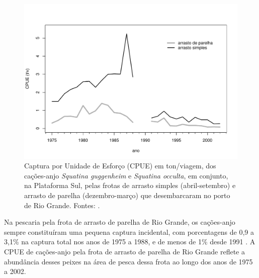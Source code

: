 \documentclass[a4paper,11pt,twoside,showtrims,onecolumn,openright,final]{memoir}
\begin{document}

%
%

\begin{figure}
\begin{center}
\includegraphics[width=\textwidth]{CPUEsafraAnjos}
\end{center}
\caption[Captura por Unidade de Esforço (CPUE) em ton/viagem, 
	 dos cações-anjo \emph{Squatina guggenheim} e \emph{Squatina occulta}, em conjunto, na Plataforma Sul, 
	 pelas frotas de arrasto simples e arrasto de parelha de Rio Grande]
	{Captura por Unidade de Esforço (CPUE) em ton/viagem, 
	 dos cações-anjo \emph{Squatina guggenheim} e \emph{Squatina occulta}, em conjunto, na Plataforma Sul, 
	 pelas frotas de arrasto simples (abril-setembro) e arrasto de parelha (dezembro-março)
	 que desembarcaram no porto de Rio Grande. Fontes: \citet{miranda2003,ceperg2003}.}
\label{fig:anjos-cpuesafra-1975a2002}
\end{figure}

 
Na pescaria pela frota de arrasto de parelha de Rio Grande, os cações-anjo sempre 
constituíram uma pequena captura incidental, com porcentagens de 0,9 a 3,1\% na 
captura total nos anos de 1975 a 1988,  e de menos de 1\% 
desde 1991 \citep{haimovici1997,miranda2003}. %
A CPUE de cações-anjo pela frota de arrasto de parelha de Rio Grande reflete a abundância 
desses peixes na área de pesca dessa frota ao longo dos anos de 1975 a 2002. 
\end{document}
